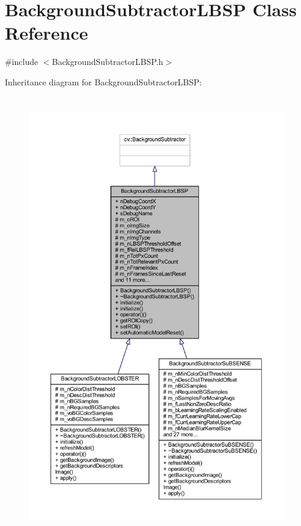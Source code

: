 \hypertarget{class_background_subtractor_l_b_s_p}{}\section{Background\+Subtractor\+L\+B\+SP Class Reference}
\label{class_background_subtractor_l_b_s_p}


{\ttfamily \#include $<$Background\+Subtractor\+L\+B\+S\+P.\+h$>$}



Inheritance diagram for Background\+Subtractor\+L\+B\+SP\+:\nopagebreak
\begin{figure}[H]
\begin{center}
\leavevmode
\includegraphics[height=550pt]{class_background_subtractor_l_b_s_p__inherit__graph}
\end{center}
\end{figure}



